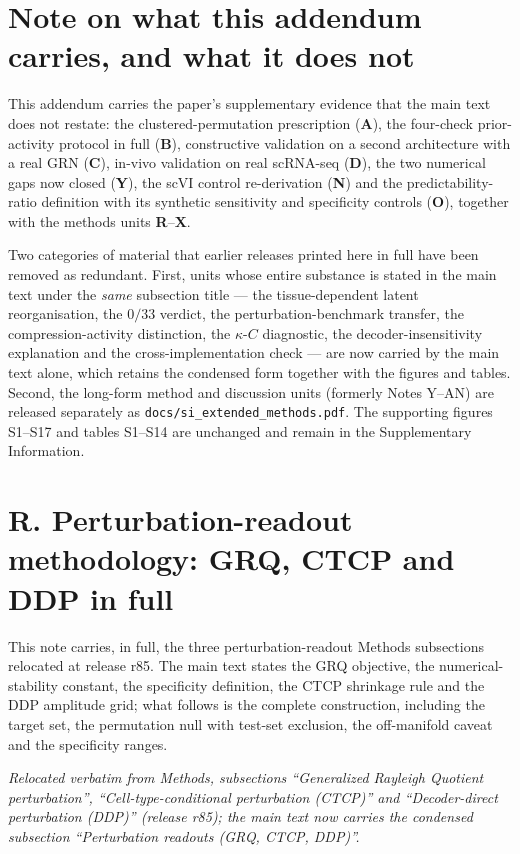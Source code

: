 \documentclass[11 pt,a4 paper]{article}
\begin{document}
\section*{Note on what this addendum carries, and what it does not}

This addendum carries the paper's supplementary evidence that the main text does not restate: the clustered-permutation prescription (\textbf{A}), the four-check prior-activity protocol in full (\textbf{B}), constructive validation on a second architecture with a real GRN (\textbf{C}), in-vivo validation on real scRNA-seq (\textbf{D}), the two numerical gaps now closed (\textbf{Y}), the scVI control re-derivation (\textbf{N}) and the predictability-ratio definition with its synthetic sensitivity and specificity controls (\textbf{O}), together with the methods units \textbf{R}--\textbf{X}.

Two categories of material that earlier releases printed here in full have been removed as redundant. First, units whose entire substance is stated in the main text under the \emph{same} subsection title --- the tissue-dependent latent reorganisation, the $0/33$ verdict, the perturbation-benchmark transfer, the compression-activity distinction, the $\kappa$-$C$ diagnostic, the decoder-insensitivity explanation and the cross-implementation check --- are now carried by the main text alone, which retains the condensed form together with the figures and tables. Second, the long-form method and discussion units (formerly Notes Y--AN) are released separately as \texttt{docs/si\_extended\_methods.pdf}. The supporting figures S1--S17 and tables S1--S14 are unchanged and remain in the Supplementary Information.

\section*{R. Perturbation-readout methodology: GRQ, CTCP and DDP in full}

This note carries, in full, the three perturbation-readout Methods subsections relocated at release r85. The main text states the GRQ objective, the numerical-stability constant, the specificity definition, the CTCP shrinkage rule and the DDP amplitude grid; what follows is the complete construction, including the target set, the permutation null with test-set exclusion, the off-manifold caveat and the specificity ranges.

\noindent\emph{Relocated verbatim from Methods, subsections ``Generalized Rayleigh Quotient perturbation'', ``Cell-type-conditional perturbation (CTCP)'' and ``Decoder-direct perturbation (DDP)'' (release r85); the main text now carries the condensed subsection ``Perturbation readouts (GRQ, CTCP, DDP)''.}
\end{document}
